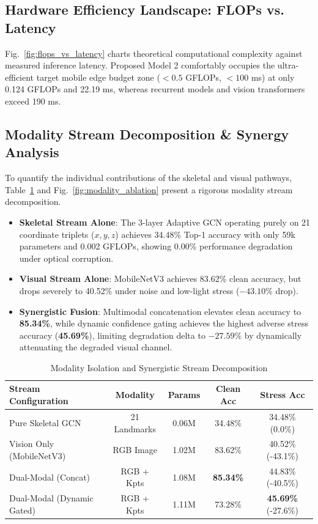 \documentclass[journal]{IEEEtran}
\begin{document}
\subsection{Hardware Efficiency Landscape: FLOPs vs. Latency}
Fig.~\ref{fig:flops_vs_latency} charts theoretical computational complexity against measured inference latency. Proposed Model 2 comfortably occupies the ultra-efficient target mobile edge budget zone ($<0.5$ GFLOPs, $<100$ ms) at only 0.124 GFLOPs and 22.19 ms, whereas recurrent models and vision transformers exceed 190 ms.

\subsection{Modality Stream Decomposition \& Synergy Analysis}
To quantify the individual contributions of the skeletal and visual pathways, Table~\ref{tab:modality} and Fig.~\ref{fig:modality_ablation} present a rigorous modality stream decomposition.
\begin{itemize}
    \item \textbf{Skeletal Stream Alone}: The 3-layer Adaptive GCN operating purely on 21 coordinate triplets ($x, y, z$) achieves 34.48\% Top-1 accuracy with only 59k parameters and 0.002 GFLOPs, showing 0.00\% performance degradation under optical corruption.
    \item \textbf{Visual Stream Alone}: MobileNetV3 achieves 83.62\% clean accuracy, but drops severely to 40.52\% under noise and low-light stress ($-43.10\%$ drop).
    \item \textbf{Synergistic Fusion}: Multimodal concatenation elevates clean accuracy to \textbf{85.34\%}, while dynamic confidence gating achieves the highest adverse stress accuracy (\textbf{45.69\%}), limiting degradation delta to $-27.59\%$ by dynamically attenuating the degraded visual channel.
\end{itemize}

\begin{table}[t]
\centering
\caption{Modality Isolation and Synergistic Stream Decomposition}
\label{tab:modality}
\begin{tabular}{lcccc}
\toprule
\textbf{Stream Configuration} & \textbf{Modality} & \textbf{Params} & \textbf{Clean Acc} & \textbf{Stress Acc} \\
\midrule
Pure Skeletal GCN & 21 Landmarks & 0.06M & 34.48\% & 34.48\% (0.0\%) \\
Vision Only (MobileNetV3) & RGB Image & 1.02M & 83.62\% & 40.52\% (-43.1\%) \\
Dual-Modal (Concat) & RGB + Kpts & 1.08M & \textbf{85.34\%} & 44.83\% (-40.5\%) \\
Dual-Modal (Dynamic Gated) & RGB + Kpts & 1.11M & 73.28\% & \textbf{45.69\%} (-27.6\%) \\
\bottomrule
\end{tabular}
\end{table}
\end{document}
